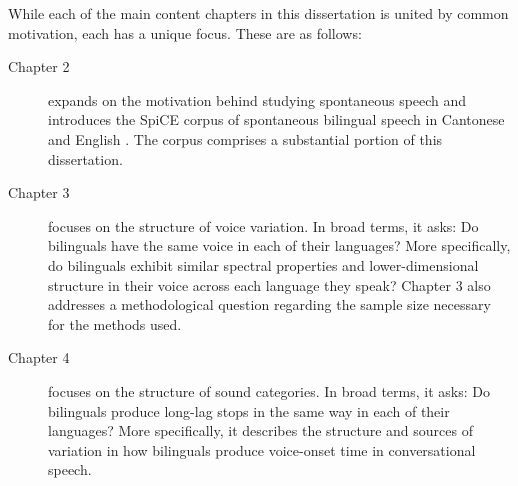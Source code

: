 While each of the main content chapters in this dissertation is united by common motivation, each has a unique focus. These are as follows:

\begin{description}
    \item[Chapter 2] expands on the motivation behind studying spontaneous speech and introduces the SpiCE corpus of spontaneous bilingual speech in Cantonese and English \citep{johnson_2021_spice}. The corpus comprises a substantial portion of this dissertation.
    \item[Chapter 3] focuses on the structure of voice variation. In broad terms, it asks: Do bilinguals have the same voice in each of their languages? More specifically, do bilinguals exhibit similar spectral properties and lower-dimensional structure in their voice across each language they speak? Chapter 3 also addresses a methodological question regarding the sample size necessary for the methods used. 
    \item[Chapter 4] focuses on the structure of sound categories. In broad terms, it asks: Do bilinguals produce long-lag stops in the same way in each of their languages? More specifically, it describes the structure and sources of variation in how bilinguals produce voice-onset time in conversational speech.
\end{description}

\endinput %
